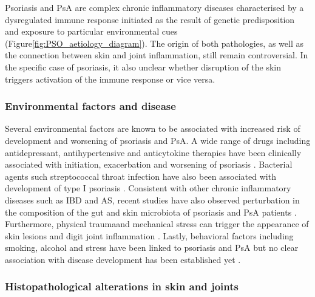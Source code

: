 Psoriasis and PsA are complex chronic inflammatory diseases characterised by a dysregulated immune response initiated as the result of genetic predisposition and exposure to particular environmental cues (Figure\ref{fig:PSO_aetiology_diagram}). The origin of both pathologies, as well as the connection between skin and joint inflammation, still remain controversial. In the specific case of psoriasis, it also unclear whether disruption of the skin triggers activation of the immune response or vice versa.


\subsubsection*{Environmental factors and disease}
Several environmental factors are known to be associated with increased risk of development and worsening of psoriasis and PsA. A wide range of drugs including antidepressant, antihypertensive and anticytokine therapies have been clinically associated with initiation, exacerbation and worsening of psoriasis \parencite{Kim2010}. Bacterial agents such streptococcal throat infection have also been associated with development of type I psoriasis \parencite{Gudjonsson2003,Valdimarsson2009, Diluvio2006}. Consistent with other chronic inflammatory diseases such as IBD and AS, recent studies have also observed perturbation in the composition of the gut and skin microbiota of psoriasis and PsA patients \parencite{add reference}. Furthermore, physical traumaand mechanical stress can trigger the appearance of skin lesions and digit joint inflammation \parencite {Weiss2002,Nestle2009}. Lastly, behavioral factors including smoking, alcohol and stress have been linked to psoriasis and PsA but no clear association with disease development has been established yet \parencite{Meglio2014}.


\subsubsection*{Histopathological alterations in skin and joints}

